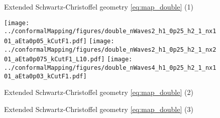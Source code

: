 \begin{figure}[h!ptb]%
\centering
{}%
{\vrule width 1pt}%
\caption{Extended Schwartz-Christoffel geometry \eqref{eq:map_double} (1)}%
\label{fig:res:double1}%
\end{figure}
\begin{figure}[h!ptb]%
\centering
{\texttt{[image: ../conformalMapping/figures/double\_nWaves2\_h1\_0p25\_h2\_1\_nx101\_aEta0p05\_kCutF1.pdf]}}%
{\texttt{[image: ../conformalMapping/figures/double\_nWaves2\_h1\_0p25\_h2\_1\_nx201\_aEta0p075\_kCutF1\_L10.pdf]}}
{\texttt{[image: ../conformalMapping/figures/double\_nWaves4\_h1\_0p25\_h2\_1\_nx101\_aEta0p03\_kCutF1.pdf]}}
\caption{Extended Schwartz-Christoffel geometry \eqref{eq:map_double} (2)}%
\label{fig:res:double2}%
\end{figure}
\begin{figure}[h!ptb]%
\centering
{}
{\vrule width 1pt}%
%
\caption{Extended Schwartz-Christoffel geometry \eqref{eq:map_double} (3)}%
\label{fig:res:double3}%
\end{figure}



